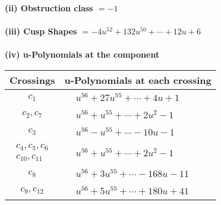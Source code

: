 \documentclass[1p]{elsarticle_modified}
\theoremstyle{definition}
\begin{document}
\flushleft \textbf{(ii) Obstruction class $= -1$}\\~\\
\flushleft \textbf{(iii) Cusp Shapes $= -4 u^{52}+132 u^{50}+\cdots+12 u+6$}\\~\\
\newpage\renewcommand{\arraystretch}{1}
\flushleft \textbf{(iv) u-Polynomials at the component}\newline \\
\begin{tabular}{m{50pt}|m{274pt}}
Crossings & \hspace{64pt}u-Polynomials at each crossing \\
\hline $$\begin{aligned}c_{1}\end{aligned}$$&$\begin{aligned}
&u^{56}+27 u^{55}+\cdots+4 u+1
\end{aligned}$\\
\hline $$\begin{aligned}c_{2},c_{7}\end{aligned}$$&$\begin{aligned}
&u^{56}+u^{55}+\cdots+2 u^2-1
\end{aligned}$\\
\hline $$\begin{aligned}c_{3}\end{aligned}$$&$\begin{aligned}
&u^{56}- u^{55}+\cdots-10 u-1
\end{aligned}$\\
\hline $$\begin{aligned}c_{4},c_{5},c_{6}\\c_{10},c_{11}\end{aligned}$$&$\begin{aligned}
&u^{56}+u^{55}+\cdots+2 u^2-1
\end{aligned}$\\
\hline $$\begin{aligned}c_{8}\end{aligned}$$&$\begin{aligned}
&u^{56}+3 u^{55}+\cdots-168 u-11
\end{aligned}$\\
\hline $$\begin{aligned}c_{9},c_{12}\end{aligned}$$&$\begin{aligned}
&u^{56}+5 u^{55}+\cdots+180 u+41
\end{aligned}$\\
\hline
\end{tabular}\\~\\
\end{document}
